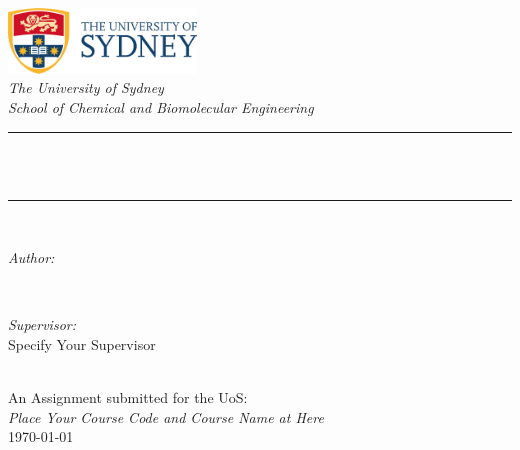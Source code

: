 \begin{titlepage}
  \newcommand{\HRule}{\rule{\linewidth}{0.5mm}}
  \includegraphics[width=5cm]{title/logo.png}
  \vspace{1cm}
  \center
  \quad\\[1.5cm]
  \textsl{\Large The University of Sydney}\\[0.5cm]
  \textsl{\large School of Chemical and Biomolecular Engineering}\\[0.5cm]
  \makeatletter
  \HRule \\[0.4cm]
  { \huge \bfseries \@title}\\[0.4cm]
  \HRule \\[1.5cm]
  \begin{minipage}{0.4\textwidth}
    \begin{flushleft} \large
      \emph{Author:}\\
      \@author
    \end{flushleft}
  \end{minipage}
  ~
  \begin{minipage}{0.4\textwidth}
    \begin{flushright} \large
      \emph{Supervisor:} \\
      \textup{Specify Your Supervisor}
    \end{flushright}
  \end{minipage}\\[3cm]
  \makeatother
  {\large An Assignment submitted for the UoS:}\\[0.5cm]
  {\large \emph{Place Your Course Code and Course Name at Here}}\\[0.5cm]
  {\large \today}\\[2cm]
  \vfill
\end{titlepage}
